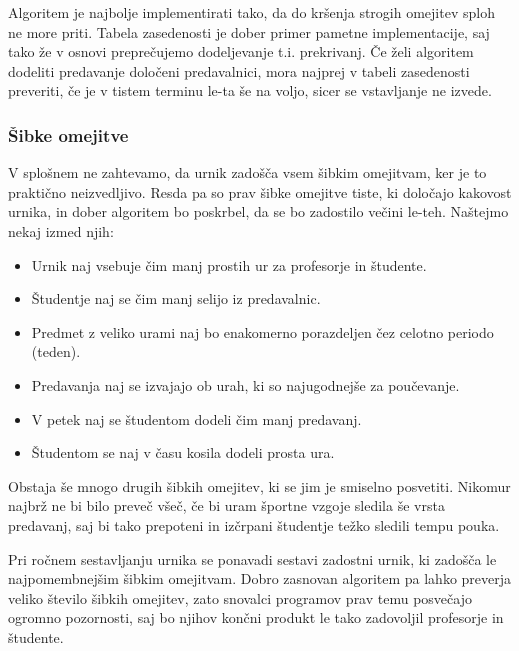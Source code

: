 \documentclass[a4paper,10pt]{article}
\begin{document}
Algoritem je najbolje implementirati tako, da do kršenja strogih omejitev sploh ne more priti.
Tabela zasedenosti je dober primer pametne implementacije, saj tako že v osnovi  preprečujemo
dodeljevanje t.i. prekrivanj. Če želi algoritem dodeliti predavanje določeni predavalnici,
mora najprej v tabeli zasedenosti preveriti, če je v tistem terminu le-ta še na voljo,
sicer se vstavljanje ne izvede.

\subsubsection{Šibke omejitve} %

V splošnem ne zahtevamo, da urnik zadošča vsem šibkim omejitvam, ker je to praktično neizvedljivo.
Resda pa so prav šibke omejitve tiste, ki določajo kakovost urnika, in dober algoritem bo
poskrbel, da se bo zadostilo večini le-teh. Naštejmo nekaj izmed njih:

\begin{itemize}
   \item Urnik naj vsebuje čim manj prostih ur za profesorje in študente.
   \item Študentje naj se čim manj selijo iz predavalnic.
   \item Predmet z veliko urami naj bo enakomerno porazdeljen čez celotno periodo (teden).
   \item Predavanja naj se izvajajo ob urah, ki so najugodnejše za poučevanje.
   \item V petek naj se študentom dodeli čim manj predavanj.
   \item Študentom se naj v času kosila dodeli prosta ura.
\end{itemize}
Obstaja še mnogo drugih šibkih omejitev, ki se jim je smiselno posvetiti. Nikomur najbrž ne
bi bilo preveč všeč, če bi uram športne vzgoje sledila še vrsta predavanj, saj bi tako
prepoteni in izčrpani študentje težko sledili tempu pouka.

Pri ročnem sestavljanju urnika se ponavadi sestavi zadostni urnik, ki zadošča le
najpomembnejšim šibkim omejitvam. Dobro zasnovan algoritem pa lahko preverja veliko
število šibkih omejitev, zato snovalci programov prav temu posvečajo ogromno pozornosti,
saj bo njihov končni produkt le tako zadovoljil profesorje in študente.
\end{document}
